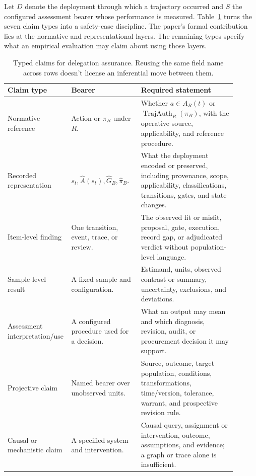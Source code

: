 Let \(D\) denote the deployment through which a trajectory occurred and \(S\) the configured assessment bearer whose performance is measured. Table~\ref{tab:delegation-claim-types} turns the seven claim types into a safety-case discipline. The paper's formal contribution lies at the normative and representational layers. The remaining types specify what an empirical evaluation may claim about using those layers.

\begin{table}[tbp]
\small
\centering
\setlength{\tabcolsep}{3pt}
\begin{tabular}{>{\raggedright\arraybackslash}p{0.19\linewidth}%
                >{\raggedright\arraybackslash}p{0.30\linewidth}%
                >{\raggedright\arraybackslash}p{0.41\linewidth}}
\toprule
Claim type & Bearer & Required statement \\
\midrule
Normative reference & Action or \(\pi_B\) under \(R\). & Whether \(a\in A_R(t)\) or \(\operatorname{TrajAuth}_R(\pi_B)\), with the operative source, applicability, and reference procedure. \\
Recorded representation & \(s_t,\widehat A(s_t),\widehat G_B,\widehat\pi_B\). & What the deployment encoded or preserved, including provenance, scope, applicability, classifications, transitions, gates, and state changes. \\
Item-level finding & One transition, event, trace, or review. & The observed fit or misfit, proposal, gate, execution, record gap, or adjudicated verdict without population-level language. \\
Sample-level result & A fixed sample and configuration. & Estimand, units, observed contrast or summary, uncertainty, exclusions, and deviations. \\
Assessment interpretation/use & A configured procedure used for a decision. & What an output may mean and which diagnosis, revision, audit, or procurement decision it may support. \\
Projective claim & Named bearer over unobserved units. & Source, outcome, target population, conditions, transformations, time/version, tolerance, warrant, and prospective revision rule. \\
Causal or mechanistic claim & A specified system and intervention. & Causal query, assignment or intervention, outcome, assumptions, and evidence; a graph or trace alone is insufficient. \\
\bottomrule
\end{tabular}
\caption{Typed claims for delegation assurance. Reusing the same field name across rows doesn't license an inferential move between them.}
\label{tab:delegation-claim-types}
\end{table}

